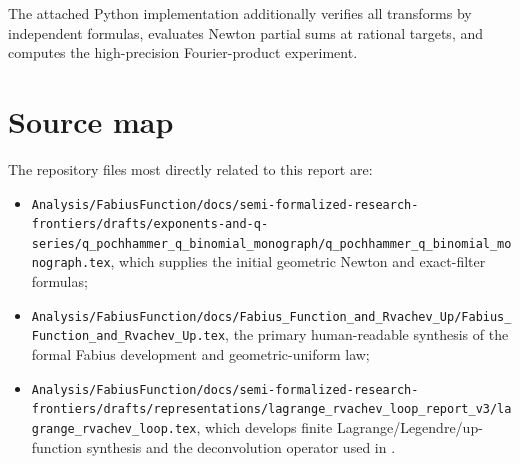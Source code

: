\documentclass[11pt,a4paper,oneside]{article}
\theoremstyle{definition}
\theoremstyle{remark}
\begin{document}
The attached Python implementation additionally verifies all transforms by
independent formulas, evaluates Newton partial sums at rational targets, and
computes the high-precision Fourier-product experiment.

\section{Source map}
\label{app:source-map}

The repository files most directly related to this report are:

\begin{itemize}
\item \nolinkurl{Analysis/FabiusFunction/docs/semi-formalized-research-frontiers/drafts/exponents-and-q-series/q_pochhammer_q_binomial_monograph/q_pochhammer_q_binomial_monograph.tex},
which supplies the initial geometric Newton and exact-filter formulas;
\item \nolinkurl{Analysis/FabiusFunction/docs/Fabius_Function_and_Rvachev_Up/Fabius_Function_and_Rvachev_Up.tex}, the primary human-readable synthesis of
the formal Fabius development and geometric-uniform law;
\item \nolinkurl{Analysis/FabiusFunction/docs/semi-formalized-research-frontiers/drafts/representations/lagrange_rvachev_loop_report_v3/lagrange_rvachev_loop.tex}, which develops
finite Lagrange/Legendre/up-function synthesis and the deconvolution operator
used in .
\end{itemize}
\end{document}
